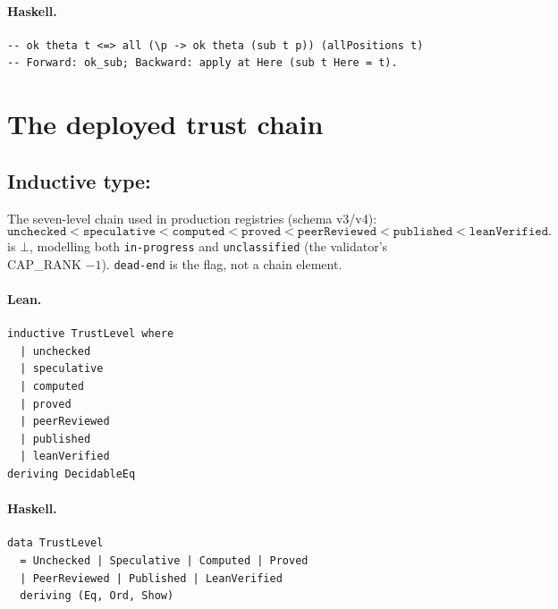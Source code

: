 \documentclass[11pt,a4paper]{article}
\begin{document}
\paragraph{Haskell.}
\begin{lstlisting}[style=haskell]
-- ok theta t <=> all (\p -> ok theta (sub t p)) (allPositions t)
-- Forward: ok_sub; Backward: apply at Here (sub t Here = t).
\end{lstlisting}

\section{The deployed trust chain}

\subsection{Inductive type: }

\begin{defn}
The seven-level chain used in production registries (schema v3/v4):
\[
  \mathtt{unchecked} < \mathtt{speculative} < \mathtt{computed} <
  \mathtt{proved} < \mathtt{peerReviewed} < \mathtt{published} <
  \mathtt{leanVerified}.
\]
 is $\bot$, modelling both \texttt{in-progress} and
\texttt{unclassified} (the validator's CAP\_RANK $-1$).  \texttt{dead-end}
is the  flag, not a chain element.
\end{defn}

\paragraph{Lean.}
\begin{lstlisting}[style=lean]
inductive TrustLevel where
  | unchecked
  | speculative
  | computed
  | proved
  | peerReviewed
  | published
  | leanVerified
deriving DecidableEq
\end{lstlisting}

\paragraph{Haskell.}
\begin{lstlisting}[style=haskell]
data TrustLevel
  = Unchecked | Speculative | Computed | Proved
  | PeerReviewed | Published | LeanVerified
  deriving (Eq, Ord, Show)
\end{lstlisting}
\end{document}
